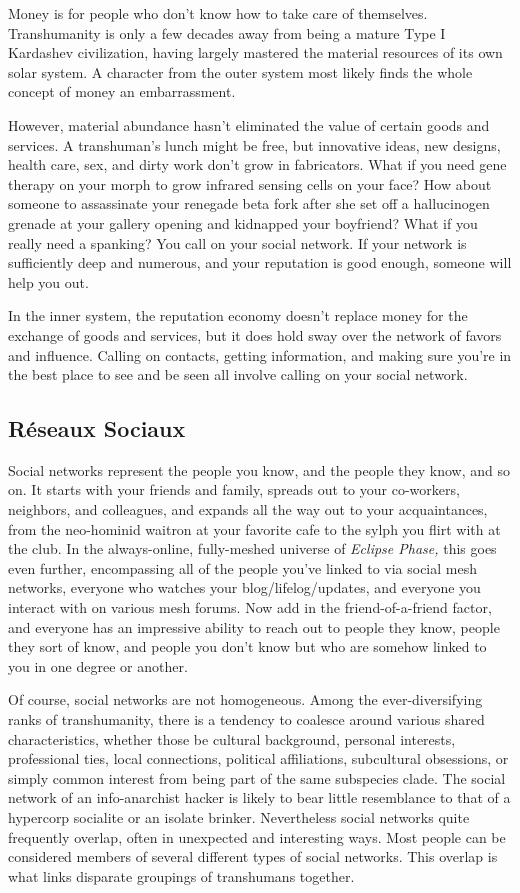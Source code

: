 Money is for people who don't know how to take care of themselves. Transhumanity is only a few decades away from being a mature Type I Kardashev civilization, having largely mastered the material resources of its own solar system. A character from the outer system most likely finds the whole concept of money an embarrassment. 

However, material abundance hasn't eliminated the value of certain goods and services. A transhuman's lunch might be free, but innovative ideas, new designs, health care, sex, and dirty work don't grow in fabricators. What if you need gene therapy on your morph to grow infrared sensing cells on your face? How about someone to assassinate your renegade beta fork after she set off a hallucinogen grenade at your gallery opening and kidnapped your boyfriend? What if you really need a spanking? You call on your social network. If your network is sufficiently deep and numerous, and your reputation is good enough, someone will help you out. 

In the inner system, the reputation economy doesn't replace money for the exchange of goods and services, but it does hold sway over the network of favors and influence. Calling on contacts, getting information, and making sure you're in the best place to see and be seen all involve calling on your social network. 

\subsection{Réseaux Sociaux} 

Social networks represent the people you know, and the people they know, and so on. It starts with your friends and family, spreads out to your co-workers, neighbors, and colleagues, and expands all the way out to your acquaintances, from the neo-hominid waitron at your favorite cafe to the sylph you flirt with at the club. In the always-online, fully-meshed universe of \textit{Eclipse Phase,} this goes even further, encompassing all of the people you've linked to via social mesh networks, everyone who watches your blog/lifelog/updates, and everyone you interact with on various mesh forums. Now add in the friend-of-a-friend factor, and everyone has an impressive ability to reach out to people they know, people they sort of know, and people you don't know but who are somehow linked to you in one degree or another. 

Of course, social networks are not homogeneous. Among the ever-diversifying ranks of transhumanity, there is a tendency to coalesce around various shared characteristics, whether those be cultural background, personal interests, professional ties, local connections, political affiliations, subcultural obsessions, or simply common interest from being part of the same subspecies clade. The social network of an info-anarchist hacker is likely to bear little resemblance to that of a hypercorp socialite or an isolate brinker. Nevertheless social networks quite frequently overlap, often in unexpected and interesting ways. Most people can be considered members of several different types of social networks. This overlap is what links disparate groupings of transhumans together. 

